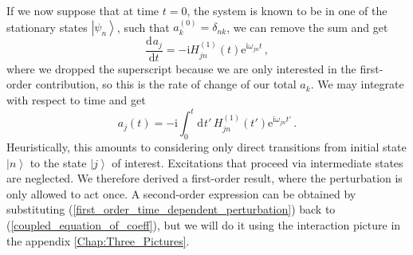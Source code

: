 \documentclass{article}
\theoremstyle{plain}\theoremheaderfont{\normalfont\itshape}\theorembodyfont{\rmfamily}\theoremseparator{.}\newtheorem*{rem}{Remark}\newtheorem*{ex}{Example}\newtheorem*{proof}{Proof}\newtheorem*{altp}{Alternative proof}
\theoremstyle{plain}\theoremheaderfont{\normalfont\bfseries}\theorembodyfont{\rmfamily}\theoremseparator{.}\newtheorem{thm}{Theorem}[section]\newtheorem{lem}[thm]{Lemma}\newtheorem{prop}[thm]{Proposition}\newtheorem*{cor}{Corollary}\newtheorem{defn}[thm]{Definition}\newtheorem{clm}[thm]{Claim}\newtheorem{clminproof}{Claim}
\theoremstyle{break}\theoremheaderfont{\normalfont\itshape}\theorembodyfont{\rmfamily}\theoremseparator{.\medskip}\newtheorem*{proofskip}{Proof}\newtheorem*{exs}{Examples}\newtheorem*{rems}{Remarks}
\theoremstyle{break}\theoremheaderfont{\normalfont\bfseries}\theorembodyfont{\rmfamily}\theoremseparator{.\medskip}\newtheorem{lemskip}[thm]{Lemma}\newtheorem{defnskip}[thm]{Definition}\newtheorem{propskip}[thm]{Proposition}\newtheorem{thmskip}[thm]{Theorem}
\numberwithin{equation}{section}
\newcommand{\ii}{\mathrm{i}}
\newcommand{\ee}{\mathrm{e}}
\newcommand{\dd}[2][]{\mathrm{d}^{#1} #2\,}
\newcommand{\dv}[3][]{\frac{\mathrm{d}^{#1} #2}{{\mathrm{d} #3}^{#1}}}
\newcommand{\ket}[1]{\left| #1 \right\rangle}
\begin{document}
    If we now suppose that at time \(t=0\), the system is known to be in one of the stationary states \(\ket{\psi_n}\), such that \(a_k^{(0)}=\delta_{nk}\), we can remove the sum and get
    \begin{equation}
        \dv{a_j}{t}=-\ii H_{jn}^{(1)}(t)\ee^{\ii\omega_{jn}t}\,,
    \end{equation}
    where we dropped the superscript because we are only interested in the first-order contribution, so this is the rate of change of our total \(a_k\). We may integrate with respect to time and get
    \begin{equation}\label{first_order_time_dependent_perturbation}
        a_j(t)=-\ii\int_{0}^{t}\dd{t'}H_{jn}^{(1)}(t')\ee^{\ii\omega_{jn}t'}\,.
    \end{equation}
    Heuristically, this amounts to considering only direct transitions from initial state \(\ket{n}\) to the state \(\ket{j}\) of interest. Excitations that proceed via intermediate states are neglected. We therefore derived a first-order result, where the perturbation is only allowed to act once. A second-order expression can be obtained by substituting (\ref{first_order_time_dependent_perturbation}) back to (\ref{coupled_equation_of_coeff}), but we will do it using the interaction picture in the appendix \cref{Chap:Three_Pictures}.
\end{document}
